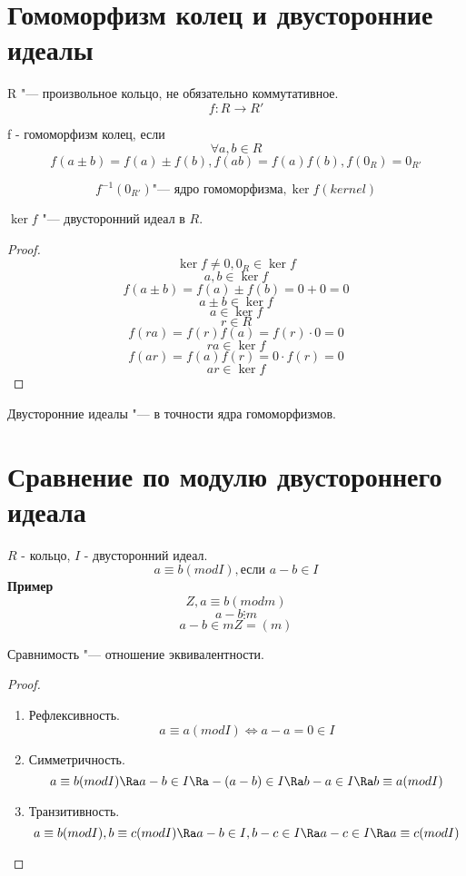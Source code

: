 \section{Гомоморфизм колец и двусторонние идеалы}
R "--- произвольное кольцо, не обязательно коммутативное.
$$f: R \to R'$$
\begin{Def}
f - гомоморфизм колец, если
$$\forall a, b \in R$$
$$f(a±b) = f(a) ± f(b), f(ab) = f(a) f(b), f(0_R) = 0_{R'}$$
\end{Def}
\begin{Def}
$$f^{-1}(0_{R'}) \text{"--- ядро гомоморфизма}, \ker f (kernel)$$
\end{Def}
\begin{theorem}
$\ker f$ "--- двусторонний идеал в $R$.
\end{theorem}
\begin{proof}
$$\ker f \ne 0, 0_R \in \ker f$$
$$a, b \in \ker f$$
$$f(a ± b) = f(a) ± f(b) = 0 + 0 = 0$$
$$a ± b \in \ker f$$
$$a \in \ker f$$
$$r \in R$$
$$f(ra) = f(r)f(a) = f(r) \cdot 0 = 0$$
$$ra \in \ker f$$
$$f(ar) = f(a)f(r) = 0 \cdot f(r) = 0$$
$$ar \in \ker f$$
\end{proof}
Двусторонние идеалы "--- в точности ядра гомоморфизмов.
\section{Сравнение по модулю двустороннего идеала}
$R$ - кольцо, $I$ - двусторонний идеал.
$$a \equiv b (mod I), \text{если } a - b \in I$$
\textbf{Пример}
$$Z, a \equiv b (mod m)$$
$$a - b \vdots m$$
$$a - b \in mZ = (m)$$
\begin{theorem}
Сравнимость "--- отношение эквивалентности.
\end{theorem}
\begin{proof}
\begin{enumerate}
\item Рефлексивность.
$$a \equiv a (mod I) \Leftrightarrow a - a = 0 \in I$$
\item Симметричность.
$$a \equiv b (mod I) \Ra a - b \in I \Ra -(a-b) \in I \Ra b - a \in I \Ra b \equiv a (mod I)$$
\item Транзитивность.
$$a \equiv b (mod I), b \equiv c (mod I) \Ra a - b \in I, b - c \in I \Ra a - c \in I \Ra a \equiv c (mod I)$$
\end{enumerate}
\end{proof}